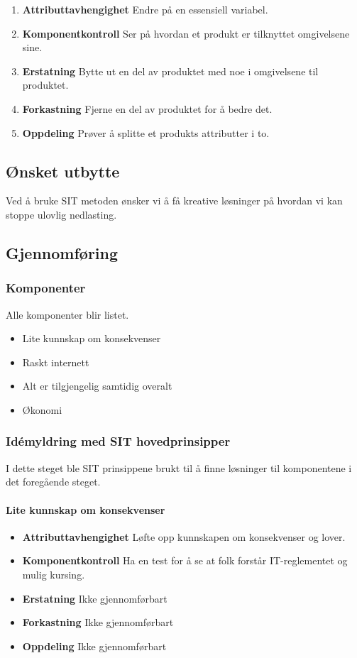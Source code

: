 \begin{enumerate}
    \item \textbf{Attributtavhengighet} Endre på en essensiell variabel.
    \item \textbf{Komponentkontroll} Ser på hvordan et produkt er tilknyttet omgivelsene sine.
    \item \textbf{Erstatning} Bytte ut en del av produktet med noe i omgivelsene til produktet.
    \item \textbf{Forkastning} Fjerne en del av produktet for å bedre det.
    \item \textbf{Oppdeling} Prøver å splitte et produkts attributter i to.
\end{enumerate}

\subsection{Ønsket utbytte}
Ved å bruke SIT metoden ønsker vi å få kreative løsninger på hvordan vi kan stoppe ulovlig nedlasting.

\subsection{Gjennomføring}

\subsubsection{Komponenter} Alle komponenter blir listet.

\begin{itemize}
    \item Lite kunnskap om konsekvenser
    \item Raskt internett
    \item Alt er tilgjengelig samtidig overalt
    \item Økonomi
\end{itemize}

\subsubsection{Idémyldring med SIT hovedprinsipper} I dette steget ble SIT prinsippene brukt til å finne løsninger til komponentene i det foregående steget.

\paragraph{Lite kunnskap om konsekvenser}
\begin{itemize}
    \item \textbf{Attributtavhengighet} Løfte opp kunnskapen om konsekvenser og lover.
    \item \textbf{Komponentkontroll} Ha en test for å se at folk forstår IT-reglementet og mulig kursing.
    \item \textbf{Erstatning} Ikke gjennomførbart
    \item \textbf{Forkastning} Ikke gjennomførbart
    \item \textbf{Oppdeling} Ikke gjennomførbart
\end{itemize}

